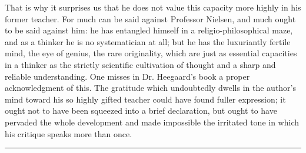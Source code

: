 \documentclass[12pt,a4paper,openany]{book}
\newcommand{\piecerule}{\par\begin{center}\rule{1.5cm}{0.4pt}\end{center}\par}
\newcommand{\opage}[1]{\marginnote{\footnotesize\textit{[#1]}}}
\begin{document}
That is why it surprises us that he does not value this capacity
more highly in his former teacher. For much can be said against
Professor Nielsen, and much ought to be said against him: he has
entangled himself in a religio-philosophical maze, and as a
thinker he is no systematician at all; but he has the luxuriantly
fertile mind, the eye of genius, the rare originality, which
are just as essential capacities in a thinker as the strictly
scientific cultivation of thought and a sharp and reliable
understanding.
\opage{109}One misses in Dr. Heegaard's book a proper acknowledgment of
this. The gratitude which undoubtedly dwells in the author's mind
toward his so highly gifted teacher could have found fuller
expression; it ought not to have been squeezed into a brief
declaration, but ought to have pervaded the whole development and
made impossible the irritated tone in which his critique speaks
more than once.
\piecerule
\end{document}
